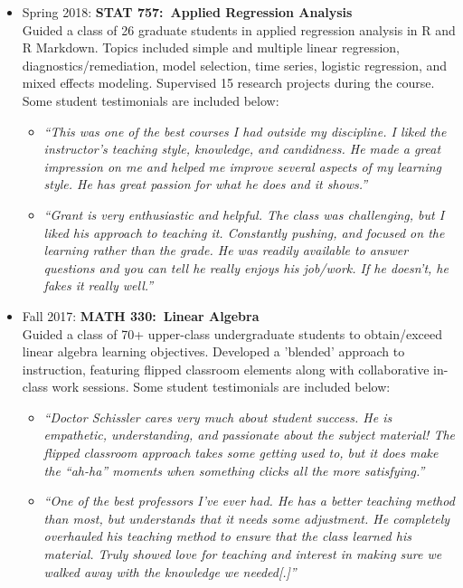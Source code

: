 \documentclass[paper=a4,fontsize=11pt]{scrartcl} %
\newcommand{\CourseEntry}[3]{
		\noindent \item{#1: \textbf{#2} \\ #3}}
\begin{document}
\begin{itemize}[noitemsep]
\CourseEntry{Spring 2018}{STAT 757:~Applied Regression Analysis}{Guided a class of 26 graduate students in applied regression analysis in R and R Markdown. Topics included simple and multiple linear regression, diagnostics/remediation, model selection, time series, logistic regression, and mixed effects modeling. Supervised 15 research projects during the course. Some student testimonials are included below:
\begin{itemize}
\item \emph{\small{``This was one of the best courses I had outside my discipline. I liked the instructor's teaching style, knowledge, and candidness. He made a great impression on me and helped me improve several aspects of my learning style. He has great passion for what he does and it shows.''}}
\item \emph{\small{``Grant is very enthusiastic and helpful. The class was challenging, but I liked his approach to teaching it. Constantly pushing, and focused on the learning rather than the grade. He was readily available to answer questions and you can tell he really enjoys his job/work. If he doesn't, he fakes it really well.''}}
\end{itemize}
}{} 

\CourseEntry{Fall 2017}{MATH 330:~Linear Algebra}{Guided a class of 70+ upper-class undergraduate students to obtain/exceed linear algebra learning objectives. Developed a 'blended' approach to instruction, featuring flipped classroom elements along with collaborative in-class work sessions. Some student testimonials are included below:
\begin{itemize}
\item \emph{\small{``Doctor Schissler cares very much about student success. He is empathetic, understanding, and passionate about the subject material! The flipped classroom approach takes some getting used to, but it does make the ``ah-ha'' moments when something clicks all the more satisfying.''}}
\item \emph{\small{``One of the best professors I've ever had. He has a better teaching method than most, but understands that it needs some adjustment.
He completely overhauled his teaching method to ensure that the class learned his material. Truly showed love for teaching and interest in making sure we walked away with the knowledge we needed[.]''}}
\end{itemize}
}{}

\end{itemize}
\end{document}
